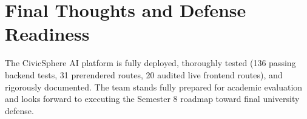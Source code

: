 \section{Final Thoughts and Defense Readiness}
\label{sec:final_thoughts}
The CivicSphere AI platform is fully deployed, thoroughly tested (136 passing backend tests, 31 prerendered routes, 20 audited live frontend routes), and rigorously documented. The team stands fully prepared for academic evaluation and looks forward to executing the Semester 8 roadmap toward final university defense.
